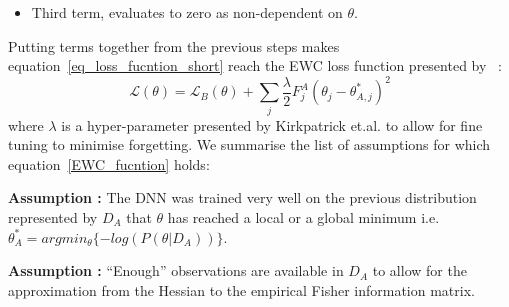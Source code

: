 \begin{itemize}
    
    
    \item Third term, evaluates to zero as non-dependent on $\theta$.
    
\end{itemize}

    

\noindent Putting terms together from the previous steps makes equation~\ref{eq_loss_fucntion_short} reach the EWC loss function presented by ~\cite{Kirkpatrick2017}: 
\begin{equation}\label{EWC_fucntion}
   \mathcal{L}(\theta) = \mathcal{L}_{B}(\theta) +  \sum_{j}^{} \frac{\lambda}{2} F^A_j (\theta_j - \theta^{*}_{A,j})^2
\end{equation}
where $\lambda$ is a hyper-parameter presented by Kirkpatrick et.al. to allow for fine tuning to minimise forgetting.
\noindent We summarise the list of assumptions for which equation~\ref{EWC_fucntion} holds:

\noindent\textbf{Assumption \assumptionEWCfirst:} The DNN was trained very well on the previous distribution represented by $D_A$ that $\theta$ has reached a local or a global minimum i.e. $\theta^{*}_{A} = argmin_{\theta}\{ -log(P(\theta|D_A))\}$. 

\noindent\textbf{Assumption \assumptionEWCsecond:} ``Enough'' observations are available in $D_A$ to allow for the approximation from the Hessian to the empirical Fisher information matrix.


